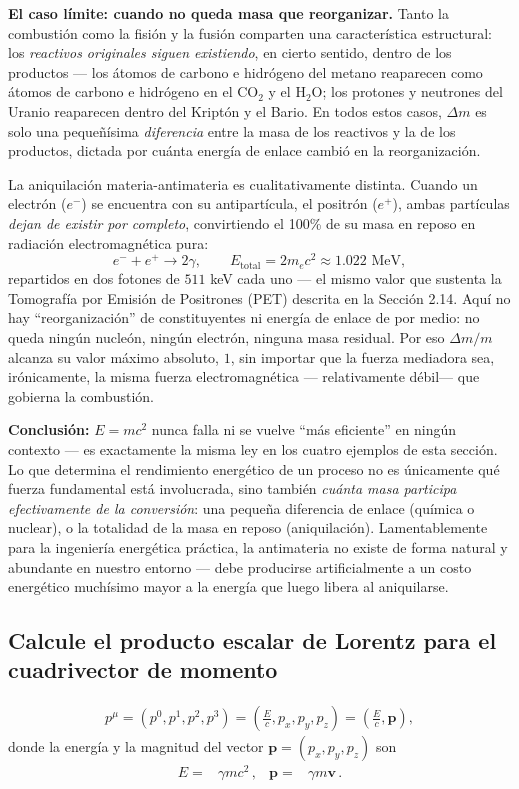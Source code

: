 \documentclass[11pt,a4paper]{book}
\begin{document}
\textbf{El caso límite: cuando no queda masa que reorganizar.} Tanto la combustión
como la fisión y la fusión comparten una característica estructural: los
\emph{reactivos originales siguen existiendo}, en cierto sentido, dentro de los
productos --- los átomos de carbono e hidrógeno del metano reaparecen como átomos
de carbono e hidrógeno en el CO$_2$ y el H$_2$O; los protones y neutrones del
Uranio reaparecen dentro del Kriptón y el Bario. En todos estos casos, $\Delta m$
es solo una pequeñísima \emph{diferencia} entre la masa de los reactivos y la de
los productos, dictada por cuánta energía de enlace cambió en la reorganización.

La aniquilación materia-antimateria es cualitativamente distinta. Cuando un
electrón ($e^-$) se encuentra con su antipartícula, el positrón ($e^+$), ambas
partículas \emph{dejan de existir por completo}, convirtiendo el 100\% de su masa
en reposo en radiación electromagnética pura:
\begin{equation}
    e^- + e^+ \rightarrow 2\gamma, \qquad E_{\text{total}} = 2m_ec^2 \approx 1.022
    \text{ MeV},
\end{equation}
repartidos en dos fotones de $511$ keV cada uno --- el mismo valor que sustenta la
Tomografía por Emisión de Positrones (PET) descrita en la Sección 2.14. Aquí no
hay ``reorganización'' de constituyentes ni energía de enlace de por medio: no
queda ningún nucleón, ningún electrón, ninguna masa residual. Por eso $\Delta m/m$
alcanza su valor máximo absoluto, $1$, sin importar que la fuerza mediadora sea,
irónicamente, la misma fuerza electromagnética --- relativamente débil--- que
gobierna la combustión.

\textbf{Conclusión:} $E=mc^2$ nunca falla ni se vuelve ``más eficiente'' en ningún
contexto --- es exactamente la misma ley en los cuatro ejemplos de esta sección.
Lo que determina el rendimiento energético de un proceso no es únicamente qué
fuerza fundamental está involucrada, sino también \emph{cuánta masa participa
efectivamente de la conversión}: una pequeña diferencia de enlace (química o
nuclear), o la totalidad de la masa en reposo (aniquilación). Lamentablemente para
la ingeniería energética práctica, la antimateria no existe de forma natural y
abundante en nuestro entorno --- debe producirse artificialmente a un costo
energético muchísimo mayor a la energía que luego libera al aniquilarse.

\subsection{Calcule el producto escalar de Lorentz para el cuadrivector de momento}
\begin{align*}
    p^\mu = \left(p^0,p^1,p^2,p^3\right) = \left(\frac{E}{c},p_x,p_y,p_z\right)=\left(\frac{E}{c},\boldsymbol{p}\right),
\end{align*}
donde la energía y la magnitud del vector $\boldsymbol{p} = (p_x,p_y,p_z)$ son
\begin{align*}
    E =&\gamma m c^2\,, & \boldsymbol{p}=&\gamma m \boldsymbol{v} \,.
\end{align*}
\end{document}
